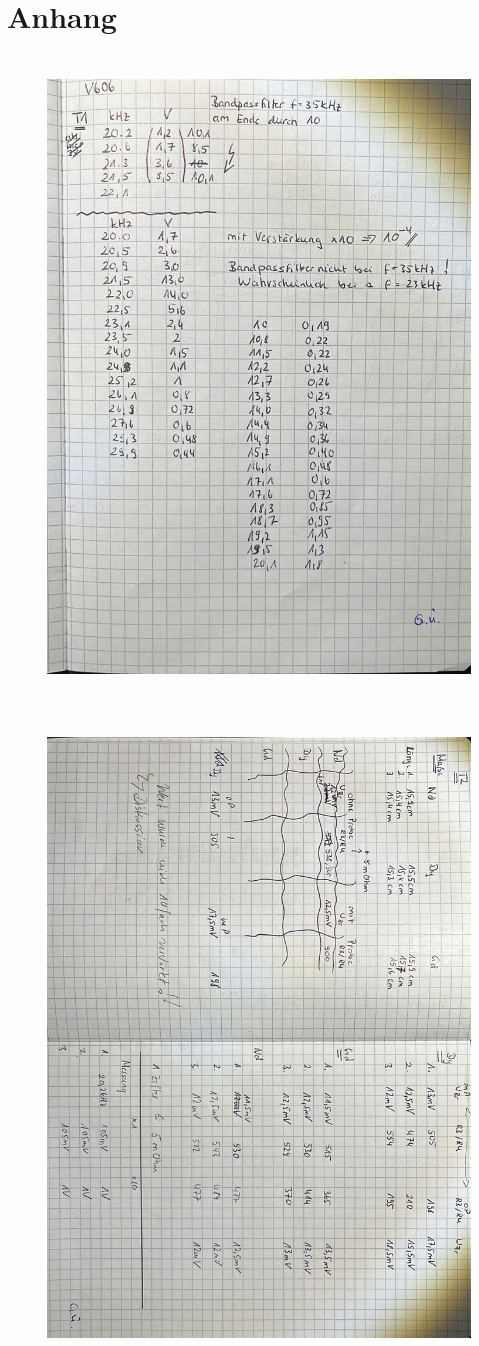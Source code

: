 \section{Anhang}

\begin{figure}[H]
    \centering
    \includegraphics[height=170mm]{bilder/Anhang1.jpeg}
\end{figure}


\begin{figure}[H]
    \centering
    \includegraphics[height=170mm]{bilder/Anhang2.jpeg}
\end{figure}
